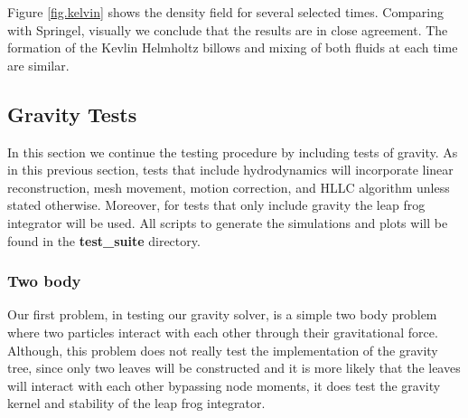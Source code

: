 Figure \ref{fig.kelvin} shows the density field for several selected times. Comparing with
Springel, visually we conclude that the results are in close agreement. The formation of the
Kevlin Helmholtz billows and mixing of both fluids at each time are similar.

\subsection{Gravity Tests}
In this section we continue the testing procedure by including tests of gravity. As in this
previous section, tests that include hydrodynamics will incorporate linear reconstruction,
mesh movement, motion correction, and HLLC algorithm unless stated otherwise. Moreover, for
tests that only include gravity the leap frog integrator will be used.
All scripts to generate the simulations and plots will be found in the \textbf{test\_suite} 
directory.

\subsubsection{Two body}
Our first problem, in testing our gravity solver, is a simple two body problem where two particles
interact with each other through their gravitational force. Although, this problem does not really 
test the implementation of the gravity tree, since only two leaves will be constructed and it is 
more likely that the leaves will interact with each other bypassing node 
moments, it does test the gravity kernel and stability of the leap frog integrator.

